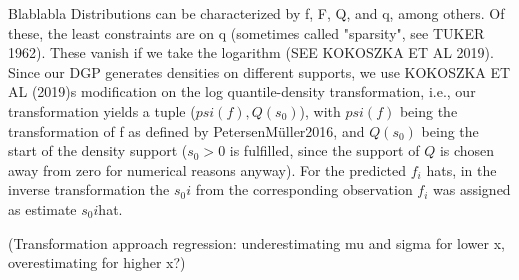 Blablabla
Distributions can be characterized by f, F, Q, and q, among others. Of these, the least 
constraints are on q (sometimes called "sparsity", see TUKER 1962). These vanish if we
take the logarithm (SEE KOKOSZKA ET AL 2019). Since our DGP generates densities on
different supports, we use KOKOSZKA ET AL (2019)s modification on the log quantile-density
transformation, i.e., our transformation yields a tuple ($psi(f), Q(s_0)$), with
$psi(f)$ being the transformation of f as defined by {PetersenMüller2016}, and
$Q(s_0)$ being the start of the density support ($s_0 > 0$ is fulfilled, since the support
of $Q$ is chosen away from zero for numerical reasons anyway). For the predicted $f_i$ hats,
in the inverse transformation the $s_0i$ from the corresponding observation $f_i$ was
assigned as estimate $s_0i$hat.

(Transformation approach regression: underestimating mu and sigma for lower x,
overestimating for higher x?)
